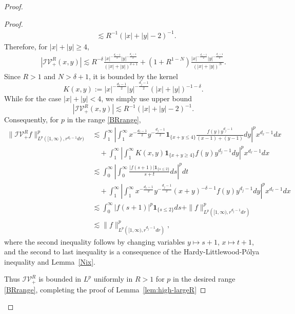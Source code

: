 \documentclass[12pt]{amsart}
\begin{document}
\begin{proof}
\begin{proof}
\begin{align*}
    &\lesssim R^{-1} (|x|+|y|-2)^{-1}.
\end{align*}
Therefore, for $|x|+|y|\ge 4$, 
\begin{align*}
    |\mathcal{IV}_+^R(x,y)| \lesssim R^{-\delta} \frac{|x|^{-\frac{d_\ell-1}{2}}|y|^{-\frac{d_j-1}{2}}}{(|x|+|y|)^{\delta+1}} + \left(1+R^{1-N}\right) \frac{|x|^{-\frac{d_\ell-1}{2}}|y|^{-\frac{d_j-1}{2}}}{(|x|+|y|)^{N}}.
\end{align*}
Since $R>1$ and $N>\delta+1$, it is bounded by the kernel
\begin{equation*}
    K(x,y):=
|x|^{-\frac{d_\ell-1}{2}}|y|^{-\frac{d_j-1}{2}}(|x|+|y|)^{-1-\delta}.
\end{equation*}
While for the case $|x|+|y|<4$, we simply use upper bound
\begin{equation*}
    |\mathcal{IV}_+^R(x,y)| \lesssim R^{-1} (|x|+|y|-2)^{-1}.
\end{equation*}
Consequently, for $p$ in the range \eqref{BRrange},
\begin{align*} 
\|\mathcal{IV}_{+}^R f\|_{L^p([1,\infty),r^{d_\ell-1}dr)}^p
&\lesssim
\int_1^\infty
\left|
\int_1^\infty
x^{-\frac{d_\ell-1}{2}}y^{-\frac{d_j-1}{2}}
\mathbf 1_{\{x+y\le 4\}}
\frac{f(y)y^{d_j-1}}{(x-1)+(y-1)} dy
\right|^p
x^{d_\ell-1} dx
\\ \nonumber
&\quad+
\int_1^\infty
\left|
\int_1^\infty
K(x,y)\mathbf 1_{\{x+y\ge 4\}}f(y)y^{d_j-1}dy
\right|^p
x^{d_\ell-1}dx
\\ \nonumber
&\lesssim
\int_0^\infty
\left|
\int_0^\infty
\frac{|f(s+1)|\mathbf 1_{\{s\le 2\}}}{s+t} ds
\right|^p
dt
\\ \nonumber
&\quad+
\int_1^\infty
\left|
\int_1^\infty
x^{-\frac{d_\ell-1}{2}}y^{-\frac{d_j-1}{2}}(x+y)^{-\delta-1}
f(y)y^{d_j-1} dy
\right|^p
x^{d_\ell-1} dx
\\ \nonumber
&\lesssim
\int_0^\infty |f(s+1)|^p\mathbf 1_{\{s\le 2\}} ds
+
\|f\|_{L^p\left([1,\infty),r^{d_j-1}dr\right)}^p
\\ \nonumber
&\lesssim
\|f\|_{L^p\left([1,\infty),r^{d_j-1}dr\right)}^p,
\end{align*}
where the second inequality follows by changing variables $y \mapsto s+1$, $x\mapsto t+1$, and the second to last inequality is a consequence of the Hardy-Littlewood-Pólya inequality \cite[Theorem~319]{HLP} and Lemma~\ref{Nix}. 

Thus $\mathcal{IV}_{+}^R$ is bounded in $L^p$ uniformly in $R>1$ for $p$ in the desired range \eqref{BRrange}, completing the proof of Lemma~\ref{lem:high-largeR}
\end{proof}



\end{proof}
\end{document}
